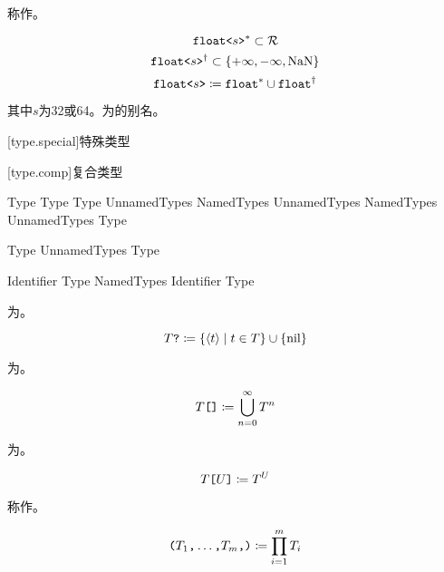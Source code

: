 \pnum
{}称作。

$$ \texttt{float<}s\texttt{>}^\ast \subset \mathcal{R} $$
$$ \texttt{float<}s\texttt{>}^\dagger \subset \{ +\infty, -\infty, \mathrm{NaN} \} $$
$$ \texttt{float<}s\texttt{>} \coloneqq \texttt{float}^\ast \cup \texttt{float}^\dagger $$

其中$s$为32或64。为的别名。

[type.special]{特殊类型}

\begin{bnf}
 \br
     \br
\end{bnf}

[type.comp]{复合类型}

\begin{bnf}
 \br
    Type  \br
    Type \terminal{[} Type \terminal{]}
    \terminal{(} UnnamedTypes \terminal{)} \br
    \terminal{(} NamedTypes \terminal{)} \br
    \terminal{(} UnnamedTypes \terminal{,} NamedTypes \terminal{)} \br
    \terminal{\{} UnnamedTypes \terminal{\}}
    Type \terminal{*}
\end{bnf}

\begin{bnf}
 \br
    Type \br
    UnnamedTypes \terminal{,} Type
\end{bnf}

\begin{bnf}
 \br
    Identifier \terminal{:} Type \br
    NamedTypes \terminal{,} Identifier \terminal{:} Type
\end{bnf}

\pnum
{}为。

$$ T\texttt{?} \coloneqq \{ \langle t \rangle \mid t \in T \} \cup \{ \mathrm{nil} \} $$

\pnum
{}为。

$$ T\texttt{[]} \coloneqq \bigcup^\infty_{n=0} T^n $$

\pnum
{}为。

$$ T\texttt{[}U\texttt{]} \coloneqq T^U $$

\pnum
{} 称作。

$$ \texttt{(}T_1\texttt{,} \ldots\texttt{,} T_m\texttt{,}\texttt{)} \coloneqq \prod^m_{i=1} T_i$$


